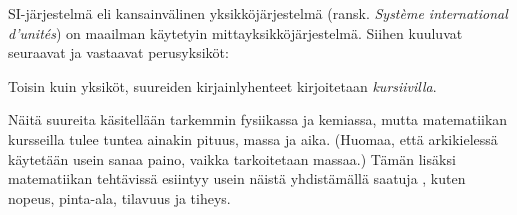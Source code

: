 SI-järjestelmä eli kansainvälinen yksikköjärjestelmä (ransk. \textit{Système international d'unités}) on maailman käytetyin mittayksikköjärjestelmä. Siihen kuuluvat seuraavat  ja vastaavat perusyksiköt:


Toisin kuin yksiköt, suureiden kirjainlyhenteet kirjoitetaan \textit{kursiivilla}. %

Näitä suureita käsitellään tarkemmin fysiikassa ja kemiassa, mutta matematiikan kursseilla tulee tuntea ainakin pituus, massa ja aika. (Huomaa, että arkikielessä käytetään usein sanaa paino, vaikka tarkoitetaan massaa.) Tämän lisäksi matematiikan tehtävissä esiintyy usein näistä yhdistämällä saatuja , kuten nopeus, pinta-ala, tilavuus ja tiheys.

